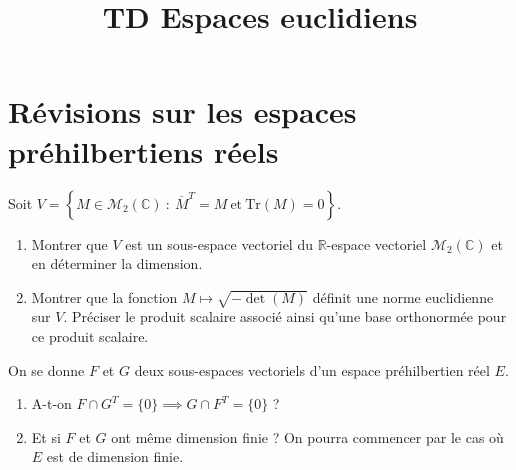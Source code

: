 \documentclass[french,a4paper]{article}
\title{TD Espaces euclidiens}
\newcommand{\R}{\mathbb{R}}
\newcommand{\C}{\mathbb{C}}
\newcommand{\Tr}{\text{Tr}}
\theoremstyle{plain}
\theoremstyle{definition}
\theoremstyle{remark}
\begin{document}
\maketitle

\section{Révisions sur les espaces préhilbertiens réels}

\begin{ex}{}
	Soit $V=\left\{M\in\mathcal{M}_2(\C)\ : \ \overline{M}^T=M\ \text{et}\ \Tr(M)=0\right\}$.
	\begin{enumerate}
		\item Montrer que $V$ est un sous-espace vectoriel du $\R$-espace vectoriel $\mathcal{M}_2(\C)$ et en déterminer la dimension.
		\item Montrer que la fonction $M\mapsto\sqrt{-\det(M)}$ définit une norme euclidienne sur $V$. Préciser le produit scalaire associé ainsi qu'une base orthonormée pour ce produit scalaire.
	\end{enumerate}
\end{ex}

\begin{ex}{}
	On se donne $F$ et $G$ deux sous-espaces vectoriels d'un espace préhilbertien réel $E$.
	\begin{enumerate}
		\item A-t-on $F\cap G^T=\{0\}\implies G\cap F^T=\{0\}$ ?
		\item Et si $F$ et $G$ ont même dimension finie ? On pourra commencer par le cas où $E$ est de dimension finie.
	\end{enumerate}
\end{ex}
\end{document}
